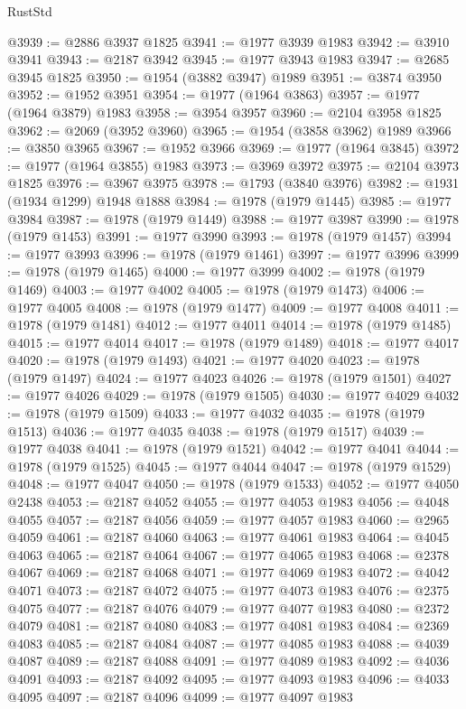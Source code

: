 \begin{lexlean}{RustStd}
\begin{coremodule}
@3939 := @2886 @3937 @1825
@3941 := @1977 @3939 @1983
@3942 := @3910 @3941
@3943 := @2187 @3942
@3945 := @1977 @3943 @1983
@3947 := @2685 @3945 @1825
@3950 := @1954 (@3882 @3947) @1989
@3951 := @3874 @3950
@3952 := @1952 @3951
@3954 := @1977 (@1964 @3863)
@3957 := @1977 (@1964 @3879) @1983
@3958 := @3954 @3957
@3960 := @2104 @3958 @1825
@3962 := @2069 (@3952 @3960)
@3965 := @1954 (@3858 @3962) @1989
@3966 := @3850 @3965
@3967 := @1952 @3966
@3969 := @1977 (@1964 @3845)
@3972 := @1977 (@1964 @3855) @1983
@3973 := @3969 @3972
@3975 := @2104 @3973 @1825
@3976 := @3967 @3975
@3978 := @1793 (@3840 @3976)
@3982 := @1931 (@1934 @1299) @1948 @1888
@3984 := @1978 (@1979 @1445)
@3985 := @1977 @3984
@3987 := @1978 (@1979 @1449)
@3988 := @1977 @3987
@3990 := @1978 (@1979 @1453)
@3991 := @1977 @3990
@3993 := @1978 (@1979 @1457)
@3994 := @1977 @3993
@3996 := @1978 (@1979 @1461)
@3997 := @1977 @3996
@3999 := @1978 (@1979 @1465)
@4000 := @1977 @3999
@4002 := @1978 (@1979 @1469)
@4003 := @1977 @4002
@4005 := @1978 (@1979 @1473)
@4006 := @1977 @4005
@4008 := @1978 (@1979 @1477)
@4009 := @1977 @4008
@4011 := @1978 (@1979 @1481)
@4012 := @1977 @4011
@4014 := @1978 (@1979 @1485)
@4015 := @1977 @4014
@4017 := @1978 (@1979 @1489)
@4018 := @1977 @4017
@4020 := @1978 (@1979 @1493)
@4021 := @1977 @4020
@4023 := @1978 (@1979 @1497)
@4024 := @1977 @4023
@4026 := @1978 (@1979 @1501)
@4027 := @1977 @4026
@4029 := @1978 (@1979 @1505)
@4030 := @1977 @4029
@4032 := @1978 (@1979 @1509)
@4033 := @1977 @4032
@4035 := @1978 (@1979 @1513)
@4036 := @1977 @4035
@4038 := @1978 (@1979 @1517)
@4039 := @1977 @4038
@4041 := @1978 (@1979 @1521)
@4042 := @1977 @4041
@4044 := @1978 (@1979 @1525)
@4045 := @1977 @4044
@4047 := @1978 (@1979 @1529)
@4048 := @1977 @4047
@4050 := @1978 (@1979 @1533)
@4052 := @1977 @4050 @2438
@4053 := @2187 @4052
@4055 := @1977 @4053 @1983
@4056 := @4048 @4055
@4057 := @2187 @4056
@4059 := @1977 @4057 @1983
@4060 := @2965 @4059
@4061 := @2187 @4060
@4063 := @1977 @4061 @1983
@4064 := @4045 @4063
@4065 := @2187 @4064
@4067 := @1977 @4065 @1983
@4068 := @2378 @4067
@4069 := @2187 @4068
@4071 := @1977 @4069 @1983
@4072 := @4042 @4071
@4073 := @2187 @4072
@4075 := @1977 @4073 @1983
@4076 := @2375 @4075
@4077 := @2187 @4076
@4079 := @1977 @4077 @1983
@4080 := @2372 @4079
@4081 := @2187 @4080
@4083 := @1977 @4081 @1983
@4084 := @2369 @4083
@4085 := @2187 @4084
@4087 := @1977 @4085 @1983
@4088 := @4039 @4087
@4089 := @2187 @4088
@4091 := @1977 @4089 @1983
@4092 := @4036 @4091
@4093 := @2187 @4092
@4095 := @1977 @4093 @1983
@4096 := @4033 @4095
@4097 := @2187 @4096
@4099 := @1977 @4097 @1983

\end{coremodule}
\end{lexlean}
